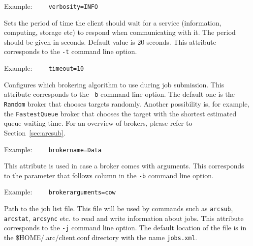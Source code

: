 Example:
\verb#    verbosity=INFO#

{}
\hspace*{0.5cm}
\begin{shaded}
\end{shaded}
Sets the period of time the client should wait for a service (information,
computing, storage etc) to respond when communicating with it. The period
should be given in seconds. Default value is 20 seconds. This attribute
corresponds to the \verb#-t# command line option.

Example:
\verb#    timeout=10#

{}
\hspace*{0.5cm}
\begin{shaded}
\end{shaded}

Configures which brokering algorithm to use during job submission. This attribute
corresponds to the \verb#-b# command line option. The
default one is the \texttt{Random} broker that chooses targets randomly.
Another possibility is, for example, the \texttt{FastestQueue} broker that
chooses the target with the shortest estimated queue waiting time. For an
overview of brokers, please refer to Section~\ref{sec:arcsub}.

 Example:
\verb#    brokername=Data#

{}
\hspace*{0.5cm}
\begin{shaded}
\end{shaded}

This attribute is used in case a broker comes with arguments. This corresponds to the
parameter that follows column in the \verb#-b# command line option.

Example:
\verb#    brokerarguments=cow#

{}
\hspace*{0.5cm}
\begin{shaded}
\end{shaded}

Path to the job list file. This file will be used by commands such as \texttt{arcsub}, \texttt{arcstat},
\texttt{arcsync} etc. to read and write information about jobs. This attribute
corresponds to the \verb#-j# command line option. The default
location of the file is in the {\$}HOME/.arc/client.conf directory with the
name \texttt{jobs.xml}.

